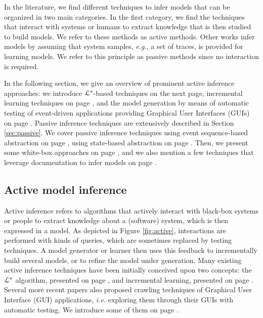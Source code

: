 In the literature, we find different techniques to infer
models that can be organized in two main categories. In the first
category, we find the techniques that interact with systems or
humans to extract knowledge that is then studied to build models.
We refer to these methods as active methods. Other works infer
models by assuming that system samples, \emph{e.g.}, a set of traces, is
provided for learning models. We refer to this principle as
passive methods since no interaction is required.

In the following section, we give an overview of prominent active
inference approaches: we introduce $\EuScript{L}^*$-based
techniques on the next page, incremental
learning techniques on page \pageref{sec:active-increment}, and
the model generation by means of automatic testing of
event-driven applications providing Graphical User Interfaces
(GUIs) on page \pageref{sec:active-crawling}. Passive inference
techniques are extensively described in Section
\vref{sec:passive}. We cover passive inference techniques using
event sequence-based abstraction on page
\pageref{sec:passive-fsa}, using state-based abstraction on page
\pageref{sec:passive-spec}. Then, we present some white-box
approaches on page \pageref{sec:passive-white}, and we also
mention a few techniques that leverage documentation to infer
models on page \pageref{sec:passive-others}.


\subsection{Active model inference}
\label{sec:active}

Active inference refers to algorithms that actively interact with
black-box systems or people to extract knowledge about a
(software) system, which is then expressed in a model. As
depicted in Figure \ref{fig:active}, interactions are performed
with kinds of queries, which are sometimes replaced by testing
techniques. A model generator or learner then uses this feedback
to incrementally build several models, or to refine the model
under generation. Many existing active inference techniques have
been initially conceived upon two concepts: the $\EuScript{L}^*$
algorithm, presented on page \pageref{sec:active-letoile}, and
incremental learning, presented on page
\pageref{sec:active-increment}. Several more recent papers also
proposed crawling techniques of Graphical User Interface (GUI)
applications, \emph{i.e.} exploring them through their GUIs with
automatic testing. We introduce some of them on page
\pageref{sec:active-crawling}.

